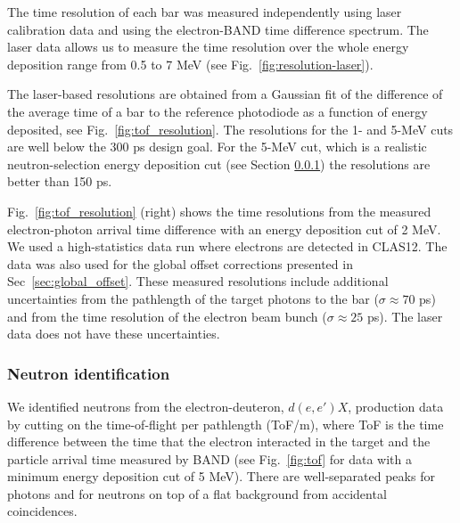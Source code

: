 \documentclass[3p,twocolumn]{elsarticle}
\begin{document}
The time resolution of each bar was measured
independently using laser calibration data and using the electron-BAND
time difference spectrum. The laser data allows us to measure the time
resolution over the whole energy deposition range from 0.5 to 7 \si{\mega\electronvolt}  (see
Fig.~\ref{fig:resolution-laser}).

The laser-based resolutions are obtained from a Gaussian fit of the difference of
the average time of a bar to the reference photodiode as a function of energy
deposited, see Fig.~\ref{fig:tof_resolution}. The resolutions for the
1- and 5-\si{\mega\electronvolt} cuts are well below the 300 \si{\pico\s} design goal. For the 5-\si{\mega\electronvolt} cut, which
is a realistic neutron-selection energy deposition cut (see Section
\ref{sec:neutronidentification}) the resolutions are better than 150 \si{\pico\s}.

Fig.~\ref{fig:tof_resolution} (right) shows the time resolutions from
the measured electron-photon arrival time difference with an energy deposition cut of 2 \si{\mega\electronvolt}. We used a high-statistics data run where
electrons are detected in CLAS12. The data was also used for the
global offset corrections presented in Sec~\ref{sec:global_offset}.
These measured resolutions include
additional uncertainties from the pathlength of the target photons
to the bar ($\sigma\approx 70$ \si{\pico\s}) and from the time resolution of the electron beam bunch ($\sigma \approx 25$ \si{\pico\s}). The
laser data does not have these uncertainties.


\subsubsection{Neutron identification}
\label{sec:neutronidentification}
We identified neutrons from the electron-deuteron, $d(e,e')X$,
production data by cutting on the
time-of-flight per pathlength (ToF/m), where ToF is the time difference
between the time that the electron
interacted in the target and the particle arrival time measured by
BAND (see Fig.~\ref{fig:tof} for data with a minimum energy deposition
cut of 5 \si{\MeV}). There are well-separated peaks for
photons and for neutrons on top of a flat background from accidental coincidences. 
\end{document}
